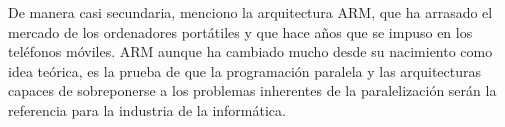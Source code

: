 \documentclass[12pt,a4paper,twoside,openright]{report}
\newcommand{\clearemptydoublepage}{%
  \clearpage
  {\pagestyle{empty}\cleardoublepage}%
}
\begin{document}
\smallskip

De manera casi secundaria, menciono la arquitectura ARM, que ha arrasado el mercado de los ordenadores portátiles y que hace años que se impuso en los teléfonos móviles. ARM aunque ha cambiado mucho desde su nacimiento como idea teórica, es la prueba de que la programación paralela y las arquitecturas capaces de sobreponerse a los problemas inherentes de la paralelización serán la referencia para la industria de la informática.


\clearemptydoublepage
\printbibliography[heading=bibintoc, title={Bibliografía}]

\end{document}
